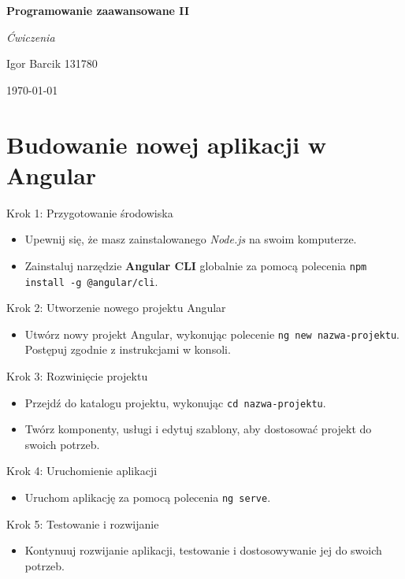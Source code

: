 \documentclass[12pt]{article}
\begin{document}
\begin{titlepage}
  \centering
  {\Huge\bfseries Programowanie zaawansowane II\par}
  \vspace{1cm}
  {\Large\itshape Ćwiczenia\par}
  \vfill
  {\large\itshape \begin{flushright}Igor Barcik 131780\par\end{flushright}}
  {\today\par}
\end{titlepage}
\tableofcontents \newpage
\section{Budowanie nowej aplikacji w Angular}
\begin{description}[leftmargin=.5em]
  \item Krok 1: Przygotowanie środowiska
  \item{\begin{itemize}
          \item Upewnij się, że masz zainstalowanego \textit{Node.js} na swoim komputerze.
          \item Zainstaluj narzędzie \textbf{Angular CLI} globalnie za pomocą polecenia \texttt{npm install -g @angular/cli}.
        \end{itemize}}
  \item Krok 2: Utworzenie nowego projektu Angular
  \item{\begin{itemize}
          \item Utwórz nowy projekt Angular, wykonując polecenie \texttt{ng new nazwa-projektu}. Postępuj zgodnie z instrukcjami w konsoli.
        \end{itemize}}
  \item Krok 3: Rozwinięcie projektu
  \item{\begin{itemize}
          \item Przejdź do katalogu projektu, wykonując \texttt{cd nazwa-projektu}.
          \item Twórz komponenty, usługi i edytuj szablony, aby dostosować projekt do swoich potrzeb.
        \end{itemize}}
  \item Krok 4: Uruchomienie aplikacji
  \item{\begin{itemize}
          \item Uruchom aplikację za pomocą polecenia \texttt{ng serve}.
        \end{itemize}}
  \item Krok 5: Testowanie i rozwijanie
  \item{\begin{itemize}
          \item Kontynuuj rozwijanie aplikacji, testowanie i dostosowywanie jej do swoich potrzeb.
        \end{itemize}}
\end{description}
\end{document}

